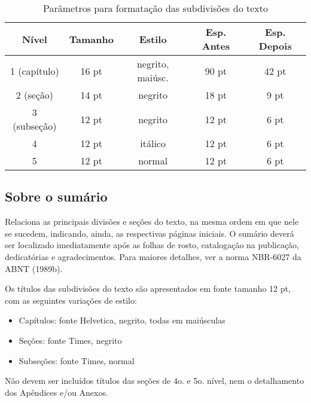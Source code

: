 \begin{table}[h]
    \caption{Parâmetros para formatação das subdivisões do texto}
    \begin{center}
        \begin{tabular}{ c | c | c | c | c }
            \hline
            Nível & Tamanho & Estilo & Esp. Antes & Esp. Depois \\
            \hline
            1 (capítulo) & 16 pt & negrito, maiúsc. & 90 pt & 42 pt \\
            \hline
            2 (seção) & 14 pt & negrito & 18 pt & 9 pt \\
            \hline
            3 (subseção) & 12 pt & negrito & 12 pt & 6 pt \\
            \hline
            4 & 12 pt & itálico & 12 pt & 6 pt \\
            \hline
            5 & 12 pt & normal & 12 pt & 6 pt \\
            \hline
        \end{tabular}
    \end{center}
    \label{tab:formatacao-subdivisao}
\end{table}

\subsection{Sobre o sumário}

Relaciona as principais divisões e seções do texto, na mesma ordem em que nele se sucedem, indicando, ainda, as respectivas páginas iniciais. O sumário deverá ser localizado imediatamente após as folhas de rosto, catalogação na publicação, dedicatórias e agradecimentos. Para maiores detalhes, ver a norma NBR-6027 da ABNT (1989b).

Os títulos das subdivisões do texto são apresentados em fonte tamanho 12 pt, com as seguintes variações de estilo:

\begin{itemize}
    \item Capítulos: fonte Helvetica, negrito, todas em maiúsculas
    \item Seções: fonte Times, negrito
    \item Subseções: fonte Times, normal
\end{itemize}

Não devem ser incluídos títulos das seções de 4o. e 5o. nível, nem o detalhamento dos Apêndices e/ou Anexos.

